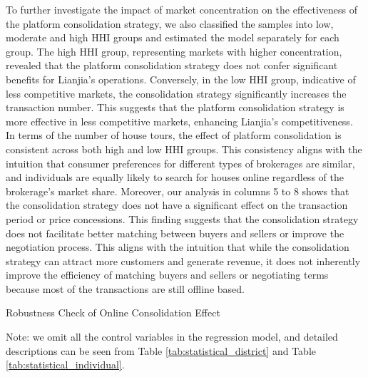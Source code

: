 \documentclass[11pt]{article}
\begin{document}

To further investigate the impact of market concentration on the effectiveness of the platform consolidation strategy, we also classified the samples into low, moderate and high HHI groups and estimated the model separately for each group. The high HHI group, representing markets with higher concentration, revealed that the platform consolidation strategy does not confer significant benefits for Lianjia's operations. Conversely, in the low HHI group, indicative of less competitive markets, the consolidation strategy significantly increases the transaction number. This suggests that the platform consolidation strategy is more effective in less competitive markets, enhancing Lianjia's competitiveness. In terms of the number of house tours, the effect of platform consolidation is consistent across both high and low HHI groups. This consistency aligns with the intuition that consumer preferences for different types of brokerages are similar, and individuals are equally likely to search for houses online regardless of the brokerage's market share. Moreover, our analysis in columns 5 to 8 shows that the consolidation strategy does not have a significant effect on the transaction period or price concessions. This finding suggests that the consolidation strategy does not facilitate better matching between buyers and sellers or improve the negotiation process. This aligns with the intuition that while the consolidation strategy can attract more customers and generate revenue, it does not inherently improve the efficiency of matching buyers and sellers or negotiating terms because most of the transactions are still offline based.

\begin{table}
  \begin{center}
    \begin{scriptsize}
      \caption{Robustness Check of Online Consolidation Effect}
      \label{tab:heter_platform_did_1}
      
    
    Note: we omit all the control variables in the regression model, and detailed descriptions can be seen from Table \ref{tab:statistical_district} and Table \ref{tab:statistical_individual}.
    \end{scriptsize}
  \end{center}
\end{table}
\end{document}

